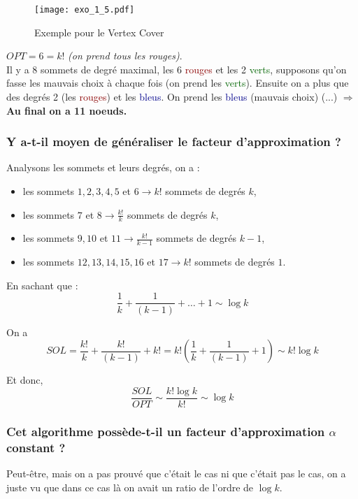 \documentclass[12pt]{article}
\newcommand{\gre}[1]{\textcolor{darkgreen}{#1}}
\newcommand{\blu}[1]{\textcolor{darkblue}{#1}}
\newcommand{\rouge}[1]{\textcolor{darkred}{#1}}
\begin{document}
\begin{figure}[H]
    \begin{center}
    \texttt{[image: exo\_1\_5.pdf]}
    \caption{Exemple pour le Vertex Cover}
    \end{center}
\end{figure}

$\boxed{OPT = 6 = k!}$ \textit{(on prend tous les rouges)}. \\

Il y a 8 sommets de degré maximal, les 6 \rouge{rouges} et les 2 \gre{verts}, supposons qu'on
fasse les mauvais choix à chaque fois (on prend les \gre{verts}). Ensuite on a plus que des degrés 2 (les \rouge{rouges}) et les
\blu{bleus}. On prend les \blu{bleus} (mauvais choix) (...) $\Rightarrow$ \textbf{Au final on a 11 noeuds.}

\subsubsection*{Y a-t-il moyen de généraliser le facteur d'approximation ?}

Analysons les sommets et leurs degrés, on a :
\begin{itemize}
\item les sommets $1,2,3,4,5$ et $6 \rightarrow k!$ sommets de degrés $k$,
\item les sommets $7$ et $8 \rightarrow \frac{k!}{k}$ sommets de degrés $k$,
\item les sommets $9,10$ et $11 \rightarrow \frac{k!}{k-1}$ sommets de degrés $k-1$,
\item les sommets $12,13,14,15,16$ et $17 \rightarrow k!$ sommets de degrés $1$.
\end{itemize}

En sachant que : $$ \frac{1}{k} + \frac{1}{(k-1)} + \ldots + 1 \sim \log{k} $$

On a $$SOL = \frac{k!}{k} + \frac{k!}{(k-1)} + k! = k! \left(\frac{1}{k} + \frac{1}{(k-1)} + 1\right) \sim k! \log{k}$$

Et donc,  $$\boxed{\frac{SOL}{OPT} \sim \frac{k!\log{k}}{k!} \sim \log{k}}$$

\subsubsection*{Cet algorithme possède-t-il un facteur d'approximation $\alpha$ constant ?}

Peut-être, mais on a pas prouvé que c'était le cas ni que c'était pas le cas, on a juste vu que dans ce cas là on avait un ratio de
l'ordre de $\log{k}$.
\end{document}
